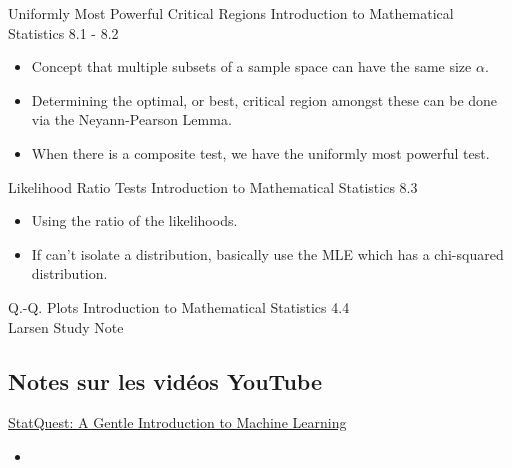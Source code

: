\begin{CHPT_SUMM_AUTO_NUMB}[label = {L.-39}]{Uniformly Most Powerful Critical Regions}
Introduction to Mathematical Statistics 8.1 - 8.2

\tcbline

\begin{itemize}
	\item	Concept that multiple subsets of a sample space can have the same size $\alpha$.
	\item	Determining the optimal, or best, critical region amongst these can be done via the Neyann-Pearson Lemma.
	\item	When there is a composite test, we have the uniformly most powerful test.
\end{itemize}
\end{CHPT_SUMM_AUTO_NUMB}

\begin{CHPT_SUMM_AUTO_NUMB}[label = {L.-40}]{Likelihood Ratio Tests}
Introduction to Mathematical Statistics 8.3

\tcbline

\begin{itemize}
	\item	Using the ratio of the likelihoods.
	\item	If can't isolate a distribution, basically use the MLE which has a chi-squared distribution.
\end{itemize}
\end{CHPT_SUMM_AUTO_NUMB}

\begin{CHPT_SUMM_AUTO_NUMB}[label = {L.-41}]{Q.-Q. Plots}
Introduction to Mathematical Statistics 4.4	\\
Larsen Study Note

\tcbline


\end{CHPT_SUMM_AUTO_NUMB}

\subsection{Notes sur les vidéos YouTube}

\begin{YTB_SUMM}[label = {SQ-BASICS-ML-INTRO}]{\href{https://www.youtube.com/watch?v=Gv9_4yMHFhI&list=PLblh5JKOoLUICTaGLRoHQDuF_7q2GfuJF&index=2&t=0s}{StatQuest: A Gentle Introduction to Machine Learning}}
\begin{itemize}
	\item	
\end{itemize}
\end{YTB_SUMM}

